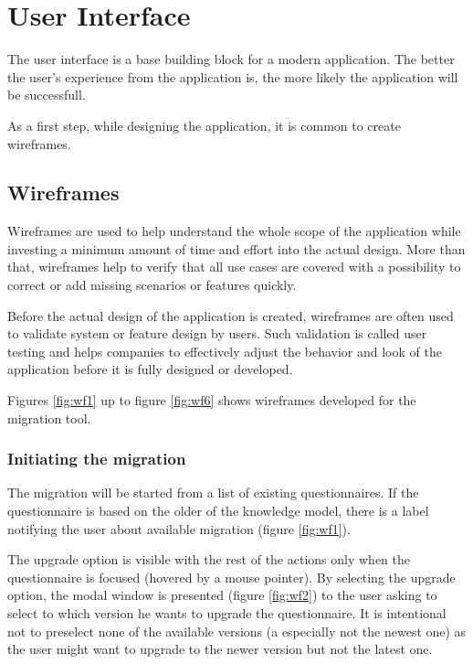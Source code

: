 \section{User Interface}\label{sec:user-interface}

The user interface is a base building block for a modern application.
The better the user's experience from the application is, the more likely the application will be successfull\cite{dciw-ux-ui}.

As a first step, while designing the application, it is common to create wireframes.

\subsection{Wireframes}\label{sec:wireframes}

Wireframes are used to help understand the whole scope of the application while investing a minimum amount of time and effort into the actual design.
More than that, wireframes help to verify that all use cases are covered with a possibility to correct or add missing scenarios or features quickly.

Before the actual design of the application is created, wireframes are often used to validate system or feature design by users.
Such validation is called user testing and helps companies to effectively adjust the behavior and look of the application before it is fully designed or developed.

Figures \ref{fig:wf1} up to figure \ref{fig:wf6} shows wireframes developed for the migration tool.

\subsubsection*{Initiating the migration}

The migration will be started from a list of existing questionnaires.
If the questionnaire is based on the older of the knowledge model, there is a label notifying the user about available migration (figure \ref{fig:wf1}).

The upgrade option is visible with the rest of the actions only when the questionnaire is focused (hovered by a mouse pointer).
By selecting the upgrade option, the modal window is presented (figure \ref{fig:wf2}) to the user asking to select to which version he wants to upgrade the questionnaire.
It is intentional not to preselect none of the available versions (a especially not the newest one) as the user might want to upgrade to the newer version but not the latest one.

